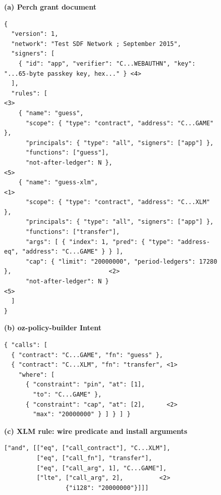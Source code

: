 \begin{figure}[tbp]
\centering
\begin{minipage}[t]{1\linewidth}\footnotesize\textbf{(a) Perch grant document}
\begin{Verbatim}[fontsize=\scriptsize,frame=single,framesep=1.5mm]
{
  "version": 1,
  "network": "Test SDF Network ; September 2015",
  "signers": [
    { "id": "app", "verifier": "C...WEBAUTHN", "key": "...65-byte passkey key, hex..." } <4>
  ],
  "rules": [                                                                             <3>
    { "name": "guess",
      "scope": { "type": "contract", "address": "C...GAME" },
      "principals": { "type": "all", "signers": ["app"] },
      "functions": ["guess"],
      "not-after-ledger": N },                                                           <5>
    { "name": "guess-xlm",                                                               <1>
      "scope": { "type": "contract", "address": "C...XLM" },
      "principals": { "type": "all", "signers": ["app"] },
      "functions": ["transfer"],
      "args": [ { "index": 1, "pred": { "type": "address-eq", "address": "C...GAME" } } ],
      "cap": { "limit": "20000000", "period-ledgers": 17280 },                           <2>
      "not-after-ledger": N }                                                            <5>
  ]
}
\end{Verbatim}
\end{minipage}\par\medskip
\begin{minipage}[t]{0.49\linewidth}\footnotesize\textbf{(b) oz-policy-builder Intent}
\begin{Verbatim}[fontsize=\scriptsize,frame=single,framesep=1.5mm]
{ "calls": [
  { "contract": "C...GAME", "fn": "guess" },
  { "contract": "C...XLM", "fn": "transfer", <1>
    "where": [
      { "constraint": "pin", "at": [1],
        "to": "C...GAME" },
      { "constraint": "cap", "at": [2],      <2>
        "max": "20000000" } ] } ] }
\end{Verbatim}
\end{minipage}\hfill
\begin{minipage}[t]{0.49\linewidth}\footnotesize\textbf{(c) XLM rule: wire predicate and install arguments}
\begin{Verbatim}[fontsize=\scriptsize,frame=single,framesep=1.5mm]
["and", [["eq", ["call_contract"], "C...XLM"],
         ["eq", ["call_fn"], "transfer"],
         ["eq", ["call_arg", 1], "C...GAME"],
         ["lte", ["call_arg", 2],          <2>
                 {"i128": "20000000"}]]]


\end{Verbatim}
\end{minipage}
\end{figure}
